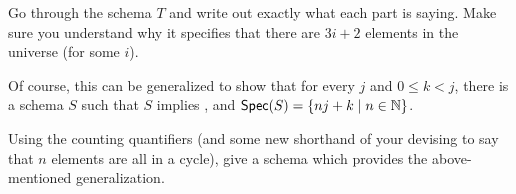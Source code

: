 \begin{aside}
    Go through the schema $T$ and write out exactly what each part is saying. Make sure you understand why it specifies that there are $3i + 2$ elements in the universe (for some $i$). 
\end{aside}

Of course, this can be generalized to show that for every $j$ and $0\leq k<j$, there is a schema $S$ such that $S$ implies \eqr, and $\mbox{$\mathsf{Spec}(S)$}=\{nj+k\mid n\in \mathbb{N}\}$. 

\begin{aside}
    Using the counting quantifiers (and some new shorthand of your devising to say that $n$ elements are all in a cycle), give a schema which provides the above-mentioned generalization. 
\end{aside}
